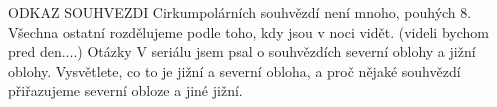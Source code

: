 \documentclass[crop=false]{standalone}
\begin{document}
ODKAZ SOUHVEZDI
Cirkumpolárních souhvězdí není mnoho, pouhých 8. Všechna ostatní rozdělujeme podle toho, kdy jsou v noci vidět.
(videli bychom pred den....)
Otázky
V seriálu jsem psal o souhvězdích severní oblohy a jižní oblohy. Vysvětlete, co to je jižní a severní obloha, a proč nějaké souhvězdí přiřazujeme severní obloze a jiné jižní.
\end{document}
